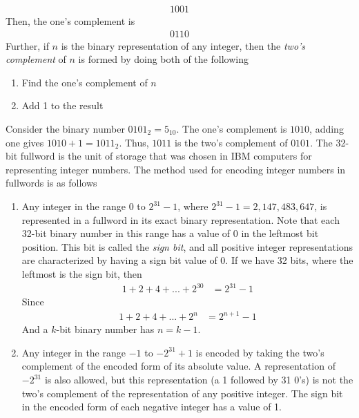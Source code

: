\documentclass{report}
\begin{document}
\begin{itemize}
\begin{align*}
                1001
            \end{align*}
            Then, the one's complement is
            \begin{align*}
                0110
            \end{align*}
            Further, if $n$ is the binary representation of any integer, then the \textit{two's complement} of $n$ is formed by doing both of the following
            \begin{enumerate}
                \item Find the one's complement of $n$
                \item Add 1 to the result
            \end{enumerate}
            Consider the binary number $0101_{2} = 5_{10}$. The one's complement is $1010$, adding one gives $1010 + 1 = 1011_{2}$. Thus, $1011$ is the two's complement of $0101$.
            \bigbreak \noindent 
            The 32-bit fullword is the unit of storage that was chosen in IBM computers for representing integer numbers. The method used for encoding integer numbers in fullwords is as follows
            \begin{enumerate}
                \item Any integer in the range $0$ to $2^{31} - 1$, where $2^{31}-1 = 2,147,483,647$, is represented in a fullword in its exact binary representation. Note that each 32-bit binary number in this range has a value of 0 in the leftmost bit position. This bit is called the \textit{sign bit}, and all positive integer representations are characterized by having a sign bit value of 0.  
                    \bigbreak \noindent 
                    If we have 32 bits, where the leftmost is the sign bit, then
                    \begin{align*}
                        1 + 2 + 4  + ... + 2^{30} &= 2^{31} -1
                    \end{align*}
                    Since 
                    \begin{align*}
                        1 + 2 + 4 + ... + 2^{n} &= 2^{n+1}-1
                    \end{align*}
                    And a $k$-bit binary number has $n = k-1$.
                \item Any integer in the range $-1$ to $-2^{31} + 1$ is encoded by taking the two's complement of the encoded form of its absolute value. A representation of $-2^{31}$ is also allowed, but this representation (a 1 followed by 31 0's) is not the two's complement of the representation of any positive integer. The sign bit in the encoded form of each negative integer has a value of 1.

\end{enumerate}
\end{itemize}
\end{document}

